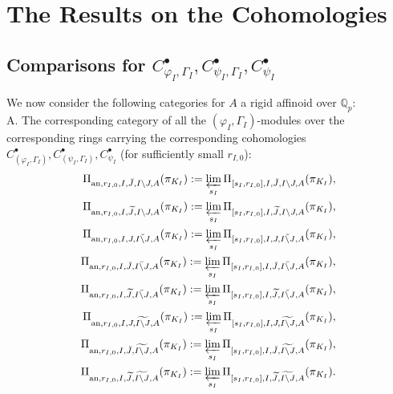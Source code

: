\documentclass[12pt]{amsart}
\theoremstyle{definition}
\numberwithin{equation}{section}
\begin{document}
\newpage

\section{The Results on the Cohomologies}

\subsection{Comparisons for $C^\bullet_{\varphi_I,\Gamma_I},C^\bullet_{\psi_I,\Gamma_I},C^\bullet_{\psi_I}$}


\noindent We now consider the following categories for $A$ a rigid affinoid over $\mathbb{Q}_p$:\\

\noindent A. The corresponding category of all the $(\varphi_I,\Gamma_I)$-modules over the corresponding rings carrying the corresponding cohomologies $C^\bullet_{(\varphi_I,\Gamma_I)},C^\bullet_{(\psi_I,\Gamma_I)},C^\bullet_{\psi_I}$ (for sufficiently small $r_{I,0}$): \\

\begin{align}
\Pi_{\mathrm{an},r_{I,0},I,\breve{J},I\backslash J,A}(\pi_{K_I}):=\varprojlim_{s_I}\Pi_{[s_I,r_{I,0}],I,\breve{J},I\backslash J,A}(\pi_{K_I}),\\	
\Pi_{\mathrm{an},r_{I,0},I,\widetilde{J},I\backslash J,A}(\pi_{K_I}):=\varprojlim_{s_I} \Pi_{[s_I,r_{I,0}],I,\widetilde{J},I\backslash J,A}(\pi_{K_I}),\\
\Pi_{\mathrm{an},r_{I,0},I,J,\breve{I\backslash J},A}(\pi_{K_I}):=\varprojlim_{s_I}\Pi_{[s_I,r_{I,0}],I,J,\breve{I\backslash J},A}(\pi_{K_I}),\\	
\Pi_{\mathrm{an},r_{I,0},I,\breve{J},\breve{I\backslash J},A}(\pi_{K_I}):=\varprojlim_{s_I} \Pi_{[s_I,r_{I,0}],I,\breve{J},\breve{I\backslash J},A}(\pi_{K_I}),\\	
\Pi_{\mathrm{an},r_{I,0},I,\widetilde{J},\breve{I\backslash J},A}(\pi_{K_I}):=\varprojlim_{s_I} \Pi_{[s_I,r_{I,0}],I,\widetilde{J},\breve{I\backslash J},A}(\pi_{K_I}),\\
\Pi_{\mathrm{an},r_{I,0},I,J,\widetilde{I\backslash J},A}(\pi_{K_I}):=\varprojlim_{s_I} \Pi_{[s_I,r_{I,0}],I,J,\widetilde{I\backslash J},A}(\pi_{K_I}),\\	
\Pi_{\mathrm{an},r_{I,0},I,\breve{J},\widetilde{I\backslash J},A}(\pi_{K_I}):=\varprojlim_{s_I} \Pi_{[s_I,r_{I,0}],I,\breve{J},\widetilde{I\backslash J},A}(\pi_{K_I}),\\	
\Pi_{\mathrm{an},r_{I,0},I,\widetilde{J},\widetilde{I\backslash J},A}(\pi_{K_I}):=\varprojlim_{s_I} \Pi_{[s_I,r_{I,0}],I,\widetilde{J},\widetilde{I\backslash J},A}(\pi_{K_I}).	
\end{align}	
\end{document}
